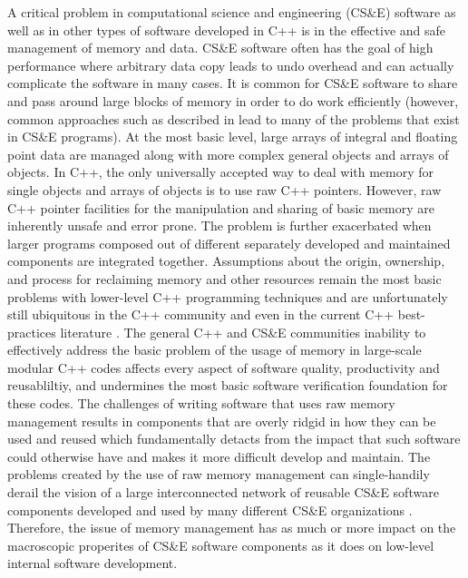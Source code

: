 \documentclass[pdf,ps2pdf,11pt]{SANDreport}
\begin{document}
A critical problem in computational science and engineering (CS\&E)
software as well as in other types of software developed in C++ is in
the effective and safe management of memory and data.  CS\&E software
often has the goal of high performance where arbitrary data copy leads
to undo overhead and can actually complicate the software in many
cases.  It is common for CS\&E software to share and pass around large
blocks of memory in order to do work efficiently (however, common
approaches such as described in
{}\cite{DataSharinginScientificSimulations} lead to many of the
problems that exist in CS\&E programs).  At the most basic level,
large arrays of integral and floating point data are managed along
with more complex general objects and arrays of objects.  In C++, the
only universally accepted way to deal with memory for single objects
and arrays of objects is to use raw C++ pointers.  However, raw C++
pointer facilities for the manipulation and sharing of basic memory
are inherently unsafe and error prone.  The problem is further
exacerbated when larger programs composed out of different separately
developed and maintained components are integrated together.
Assumptions about the origin, ownership, and process for reclaiming
memory and other resources remain the most basic problems with
lower-level C++ programming techniques and are unfortunately still
ubiquitous in the C++ community and even in the current C++
best-practices literature {}\cite{C++CodingStandards05,
EffectiveC++ThirdEdition}.  The general C++ and CS\&E communities
inability to effectively address the basic problem of the usage of
memory in large-scale modular C++ codes affects every aspect of
software quality, productivity and reusabliltiy, and undermines the
most basic software verification foundation for these codes.  The
challenges of writing software that uses raw memory management results
in components that are overly ridgid in how they can be used and
reused which fundamentally detacts from the impact that such software
could otherwise have and makes it more difficult develop and maintain.
The problems created by the use of raw memory management can
single-handily derail the vision of a large interconnected network of
reusable CS\&E software components developed and used by many
different CS\&E organizations {}\cite{HPCNeedsAToolsStrategy05}.
Therefore, the issue of memory management has as much or more impact
on the macroscopic properites of CS\&E software components as it does
on low-level internal software development.
\end{document}
